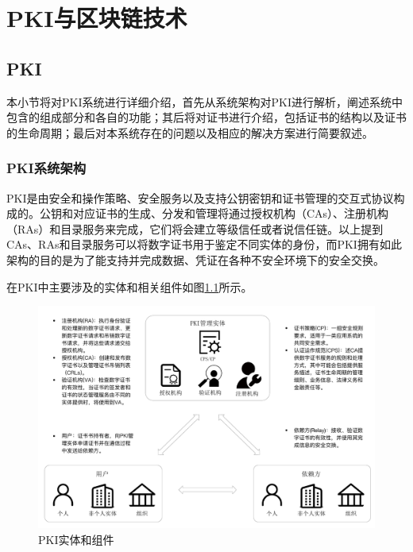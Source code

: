 
\chapter{PKI与区块链技术}



\section{PKI}

本小节将对PKI系统进行详细介绍，首先从系统架构对PKI进行解析，阐述系统中包含的组成部分和各自的功能；其后将对证书进行介绍，包括证书的结构以及证书的生命周期；最后对本系统存在的问题以及相应的解决方案进行简要叙述。

\subsection{PKI系统架构}


PKI是由安全和操作策略、安全服务以及支持公钥密钥和证书管理的交互式协议构成的。公钥和对应证书的生成、分发和管理将通过授权机构（CAs）、注册机构（RAs）和目录服务来完成\supercite{weise2001public}，它们将会建立等级信任或者说信任链。以上提到CAs、RAs和目录服务可以将数字证书用于鉴定不同实体的身份，而PKI拥有如此架构的目的是为了能支持并完成数据、凭证在各种不安全环境下的安全交换。

在PKI中主要涉及的实体和相关组件如图\ref{fig:pki}所示。

\begin{figure}[htbp]
 	\centering
 	\includegraphics[width = 1\textwidth]{img/pki}
 	\caption{PKI实体和组件}\label{fig:pki}
\end{figure}



